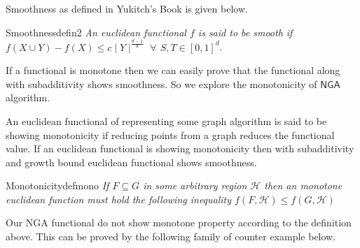 \documentclass{article}
\begin{document}
Smoothness as defined in Yukitch's Book is given below.

\begin{define}{Smoothness}{defin2}
    \textit{An euclidean functional $f$ is said to be smooth if $f(X \cup Y) - f(X)\leq c\mid Y\mid^{\frac{d-1}{d}}$
        $\forall$ $S, T \in \left[0,1 \right]^d$}.
\end{define}

If a functional is monotone then we can easily prove that the functional along
with subadditivity shows smoothness. So we explore the monotonicity of
$\textsf{NGA}$ algorithm.

An euclidean functional of representing some graph algorithm is said to be showing monotonicity if reducing points from a graph reduces the functional value.
If an euclidean functional is showing monotonicity then with subadditivity and growth bound euclidean functional shows smoothness.

\begin{define}{Monotonicity}{defmono}
    \textit{If $F \subseteq G$ in some arbitrary region $\mathcal{H}$ then an monotone euclidean function
    must hold the following inequality $f(F, \mathcal{H}) \leq f(G, \mathcal{H})$}
\end{define}

Our \textsf{NGA} functional do not show monotone property according to the definition above. This can be proved
by the following family of counter example below.
\end{document}
